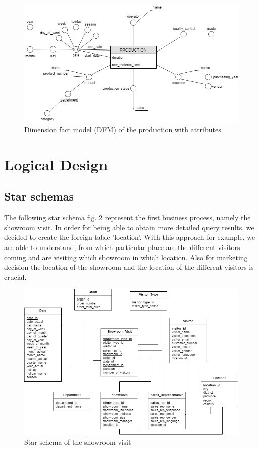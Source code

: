 \documentclass[letterpaper,12pt]{article}
\begin{document}
\begin{figure}[h] 
        \centering
        \includegraphics[width=\columnwidth]{../images/DFM_Production.png}
        \caption{
                \label{fig:productionAttributes}  
                Dimension fact model (DFM) of the production with attributes 
        }
\end{figure}

\section{Logical Design}

\subsection{Star schemas}

The following star schema fig. \ref{fig:starschemaShowroom} represent the first business process, namely the showroom visit. In order for being able to obtain more detailed query results, we decided to create the foreign table 'location'. With this approach for example, we are able to understand, from which particular place are the different visitors coming and are visiting which showroom in which location. Also for marketing decision the location of the showroom and the location of the different visitors is crucial.

\begin{figure}[H] 
        \centering
        \includegraphics[width=\columnwidth]{../images/Starschema_Showroom_visit.png}
        \caption{
                \label{fig:starschemaShowroom}  
                Star schema of the showroom visit
        }
\end{figure}
\end{document}
